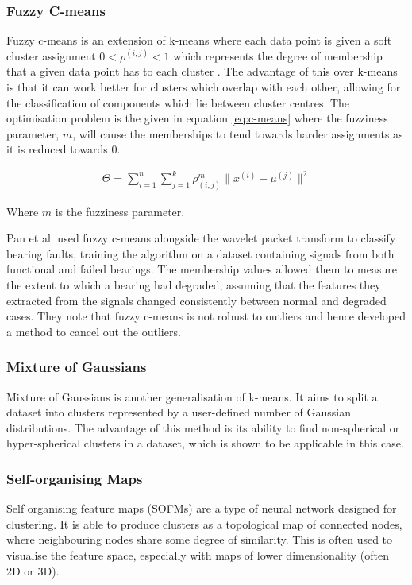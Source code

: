 \documentclass[reprint,NumberedRefs]{JASA}
\begin{document}
\subsubsection{Fuzzy C-means}
Fuzzy c-means is an extension of k-means where each data point is given a soft cluster assignment $0<\rho^{(i,j)}<1$ which represents the degree of membership that a given data point has to each cluster \cite{aghabozorgi2015time}. The advantage of this over k-means is that it can work better for clusters which overlap with each other, allowing for the classification of components which lie between cluster centres. The optimisation problem is the given in equation \ref{eq:c-means} where the fuzziness parameter, $m$, will cause the memberships to tend towards harder assignments as it is reduced towards 0.

\begin{align}
\Theta = \sum_{i=1}^{n}{\sum_{j=1}^{k}{\rho_{(i,j)}^m \lVert x^{(i)} - \mu^{(j)} \rVert^2}}
\label{eq:c-means}
\end{align}

Where $m$ is the fuzziness parameter.

Pan et al. \cite{pan2010bearing} used fuzzy c-means alongside the wavelet packet transform to classify bearing faults, training the algorithm on a dataset containing signals from both functional and failed bearings. The membership values allowed them to measure the extent to which a bearing had degraded, assuming that the features they extracted from the signals changed consistently between normal and degraded cases. They note that fuzzy c-means is not robust to outliers and hence developed a method to cancel out the outliers.

\subsubsection{Mixture of Gaussians}
Mixture of Gaussians is another generalisation of k-means. It aims to split a dataset into clusters represented by a user-defined number of Gaussian distributions. The advantage of this method is its ability to find non-spherical or hyper-spherical clusters in a dataset, which is shown to be applicable in this case.

\subsubsection{Self-organising Maps}
Self organising feature maps (SOFMs) are a type of neural network designed for clustering. It is able to produce clusters as a topological map of connected nodes, where neighbouring nodes share some degree of similarity. This is often used to visualise the feature space, especially with maps of lower dimensionality (often 2D or 3D).
\end{document}
